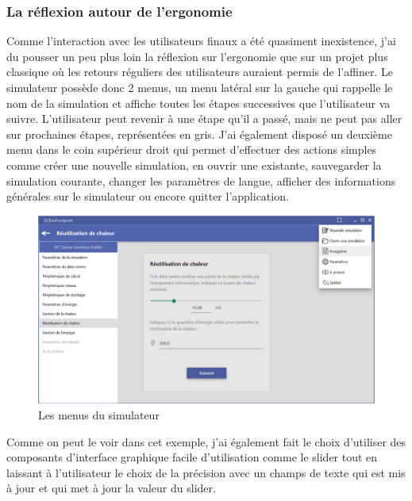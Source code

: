 \subsubsection{La réflexion autour de l'ergonomie}
Comme l'interaction avec les utilisateurs finaux a été quasiment inexistence, j'ai du pousser un peu plus loin la réflexion sur l'ergonomie que sur un projet plus classique où les retours réguliers des utilisateurs auraient permis de l'affiner. Le simulateur possède donc 2 menus, un menu latéral sur la gauche qui rappelle le nom de la simulation et affiche toutes les étapes successives que l'utilisateur va suivre. L'utilisateur peut revenir à une étape qu'il a passé, mais ne peut pas aller sur prochaines étapes, représentées en gris. J'ai également disposé un deuxième menu dans le coin supérieur droit qui permet d'effectuer des actions simples comme créer une nouvelle simulation, en ouvrir une existante, sauvegarder la simulation courante, changer les paramètres de langue, afficher des informations générales sur le simulateur ou encore quitter l'application.

\begin{figure}[h]
	\begin{center}
		\includegraphics[scale=0.40]{partie2/images/ergonomie1.png}
		\caption{Les menus du simulateur}
	\end{center}
\end{figure}

Comme on peut le voir dans cet exemple, j'ai également fait le choix d'utiliser des composants d'interface graphique facile d'utilisation comme le slider tout en laissant à l'utilisateur le choix de la précision avec un champs de texte qui est mis à jour et qui met à jour la valeur du slider.

